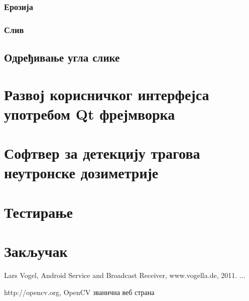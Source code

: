 \documentclass[12pt,a4paper,serbian,oneside]{book}
\begin{document}
\subsection{Ерозија}

\subsection{Слив}

\section{Одређивање угла слике}

\chapter{Развој корисничког интерфејса употребом Qt фрејмворка}

\chapter{Софтвер за детекцију трагова неутронске дозиметрије}

\chapter{Тестирање}

\chapter{Закључак}


%
%
\begin{thebibliography}{11}
 {Lars Vogel, Android Service and Broadcast Receiver, www.vogella.de, 2011.}
 ...

 http:\slash \slash opencv.org, OpenCV званична веб страна

\end{thebibliography}

	
\end{document}
